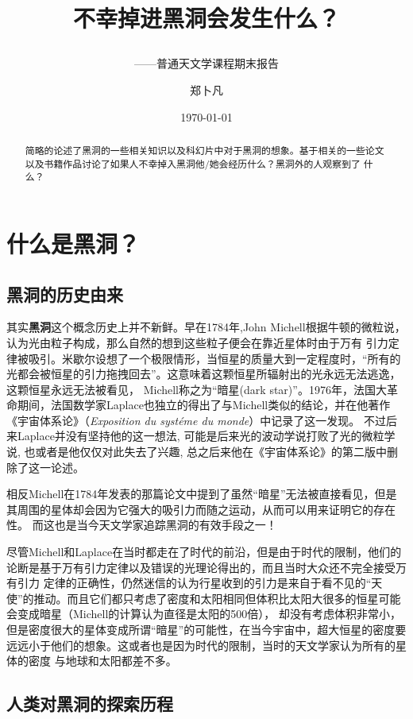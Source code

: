 \documentclass{ctexart}
\title{不幸掉进黑洞会发生什么？\\ \subtitle{——普通天文学课程期末报告}  } %
\author{郑卜凡\quad2021302022016}                     %
\date{\today}                             %
\begin{document}
    \maketitle              %
    \begin{abstract}
        简略的论述了黑洞的一些相关知识以及科幻片中对于黑洞的想象。基于相关的一些论文以及书籍作品讨论了如果人不幸掉入黑洞他/她会经历什么？黑洞外的人观察到了
        什么？
    \end{abstract}
    \tableofcontents        %
    \section{什么是黑洞？}
    \subsection{黑洞的历史由来}
        其实\textbf{黑洞}这个概念历史上并不新鲜。早在1784年,John Michell根据牛顿的微粒说，认为光由粒子构成，那么自然的想到这些粒子便会在靠近星体时由于万有
        引力定律被吸引。米歇尔设想了一个极限情形，当恒星的质量大到一定程度时，“所有的光都会被恒星的引力拖拽回去”。这意味着这颗恒星所辐射出的光永远无法逃逸，这颗恒星永远无法被看见，
        Michell称之为“暗星(dark star)”。1976年，法国大革命期间，法国数学家Laplace也独立的得出了与Michell类似的结论，并在他著作《宇宙体系论》（{\itshape Exposition du syst\'eme du monde}）中记录了这一发现。\cite{montgomery2009michell}
        不过后来Laplace并没有坚持他的这一想法, 可能是后来光的波动学说打败了光的微粒学说, 也或者是他仅仅对此失去了兴趣, 总之后来他在《宇宙体系论》的第二版中删除了这一论述。

        相反Michell在1784年发表的那篇论文中提到了虽然“暗星”无法被直接看见，但是其周围的星体却会因为它强大的吸引力而随之运动，从而可以用来证明它的存在性。\cite{1784michell}
        而这也是当今天文学家追踪黑洞的有效手段之一！

        尽管Michell和Laplace在当时都走在了时代的前沿，但是由于时代的限制，他们的论断是基于万有引力定律以及错误的光理论得出的，而且当时大众还不完全接受万有引力
        定律的正确性，仍然迷信的认为行星收到的引力是来自于看不见的“天使”的推动。\cite{feynman2011feynman}而且它们都只考虑了密度和太阳相同但体积比太阳大很多的恒星可能会变成暗星（Michell的计算认为直径是太阳的500倍），
        却没有考虑体积非常小，但是密度很大的星体变成所谓“暗星”的可能性，在当今宇宙中，超大恒星的密度要远远小于他们的想象。这或者也是因为时代的限制，当时的天文学家认为所有的星体的密度
        与地球和太阳都差不多。
        
    \subsection{人类对黑洞的探索历程}
\end{document}
